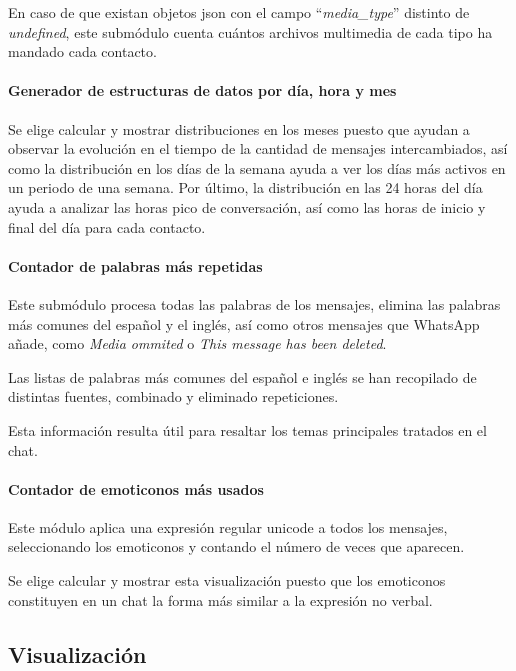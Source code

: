 En caso de que existan objetos \acrshort{json} con el campo ``\textit{media\_type}'' distinto de \textit{undefined}, este submódulo cuenta cuántos archivos multimedia de cada tipo ha mandado cada contacto.

\paragraph{Generador de estructuras de datos por día, hora y mes}

Se elige calcular y mostrar distribuciones en los meses puesto que ayudan a observar la evolución en el tiempo de la cantidad de mensajes intercambiados, así como la distribución en los días de la semana ayuda a ver los días más activos en un periodo de una semana. Por último, la distribución en las 24 horas del día ayuda a analizar las horas pico de conversación, así como las horas de inicio y final del día para cada contacto.

\paragraph{Contador de palabras más repetidas}

Este submódulo procesa todas las palabras de los mensajes, elimina las palabras más comunes del español y el inglés, así como otros mensajes que WhatsApp añade, como \textit{Media ommited} o \textit{This message has been deleted}.

Las listas de palabras más comunes del español e inglés se han recopilado de distintas fuentes, combinado y eliminado repeticiones.

Esta información resulta útil para resaltar los temas principales tratados en el chat.

\paragraph{Contador de emoticonos más usados}

Este módulo aplica una expresión regular unicode a todos los mensajes, seleccionando los emoticonos y contando el número de veces que aparecen.

Se elige calcular y mostrar esta visualización puesto que los emoticonos constituyen en un chat la forma más similar a la expresión no verbal.

\subsection{Visualización}

